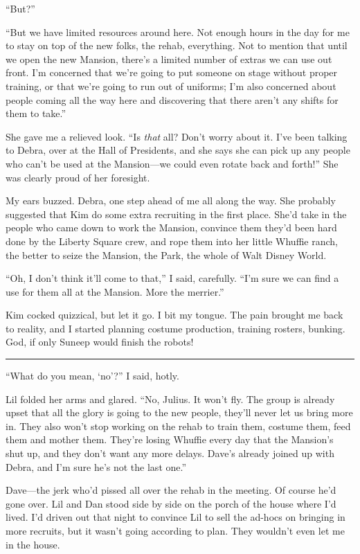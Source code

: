 “But?”

“But we have limited resources around here. Not enough hours in the
day for me to stay on top of the new folks, the rehab, everything.
Not to mention that until we open the new Mansion, there's a
limited number of extras we can use out front. I'm concerned that
we're going to put someone on stage without proper training, or
that we're going to run out of uniforms; I'm also concerned about
people coming all the way here and discovering that there aren't
any shifts for them to take.”

She gave me a relieved look. “Is \emph{that} all? Don't worry about
it. I've been talking to Debra, over at the Hall of Presidents, and
she says she can pick up any people who can't be used at the
Mansion—we could even rotate back and forth!” She was clearly proud
of her foresight.

My ears buzzed. Debra, one step ahead of me all along the way. She
probably suggested that Kim do some extra recruiting in the first
place. She'd take in the people who came down to work the Mansion,
convince them they'd been hard done by the Liberty Square crew, and
rope them into her little Whuffie ranch, the better to seize the
Mansion, the Park, the whole of Walt Disney World.

“Oh, I don't think it'll come to that,” I said, carefully. “I'm
sure we can find a use for them all at the Mansion. More the
merrier.”

Kim cocked quizzical, but let it go. I bit my tongue. The pain
brought me back to reality, and I started planning costume
production, training rosters, bunking. God, if only Suneep would
finish the robots!

\begin{center}\rule{3in}{0.4pt}\end{center}

“What do you mean, ‘no’?” I said, hotly.

Lil folded her arms and glared. “No, Julius. It won't fly. The
group is already upset that all the glory is going to the new
people, they'll never let us bring more in. They also won't stop
working on the rehab to train them, costume them, feed them and
mother them. They're losing Whuffie every day that the Mansion's
shut up, and they don't want any more delays. Dave's already joined
up with Debra, and I'm sure he's not the last one.”

Dave—the jerk who'd pissed all over the rehab in the meeting. Of
course he'd gone over. Lil and Dan stood side by side on the porch
of the house where I'd lived. I'd driven out that night to convince
Lil to sell the ad-hocs on bringing in more recruits, but it wasn't
going according to plan. They wouldn't even let me in the house.


